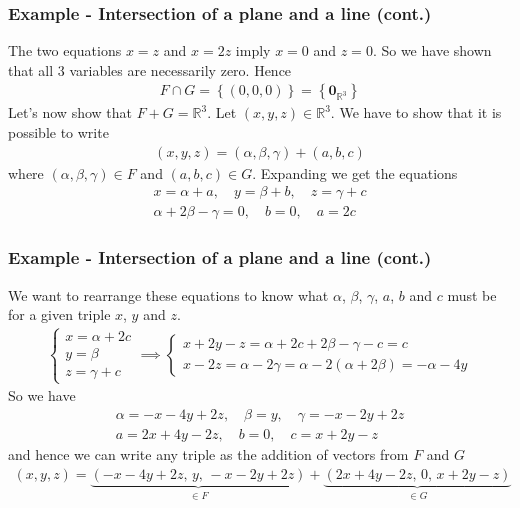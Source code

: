 \documentclass[usenames,dvipsnames,aspectratio=169,10pt]{beamer}
\numberwithin{equation}{section}
\begin{document}
\begin{frame}
\frametitle{Example - Intersection of a plane and a line (cont.)}

The two equations $x=z$ and $x=2z$ imply $x=0$ and $z=0$. So we have shown that all 3 variables are necessarily zero. Hence
\begin{align*}
F \cap G = \left\{ (0,0,0)  \right\} = \left\{ \textbf{0}_{\mathbb{R}^3} \right\}
\end{align*} 
Let's now show that $F+G=\mathbb{R}^3$. Let $(x,y,z)\in \mathbb{R}^3$. We have to show that it is possible to write
\begin{align*}
(x,y,z) = (\alpha,\beta,\gamma) + (a,b,c)
\end{align*}
where $(\alpha,\beta,\gamma)\in F$ and $(a,b,c)\in G$. Expanding we get the equations
\begin{align*}
x = \alpha + a, \quad y = \beta + b, \quad z = \gamma + c \\
\alpha+2\beta-\gamma=0, \quad  b=0, \quad a=2c
\end{align*}
\end{frame}



\begin{frame}
\frametitle{Example - Intersection of a plane and a line (cont.)}
We want to rearrange these equations to know what $\alpha$, $\beta$, $\gamma$, $a$, $b$ and $c$ must be for a given triple $x$, $y$ and $z$.
\begin{align*}
\begin{cases}
x = \alpha + 2c \\
y = \beta \\
z = \gamma + c
\end{cases}
\implies
\begin{cases}
x + 2y - z =  \alpha + 2c + 2\beta - \gamma - c = c\\
x - 2z = \alpha - 2\gamma = \alpha - 2(\alpha+2\beta) = -\alpha-4y
\end{cases}
\end{align*}
So we have \vspace{-0.3cm}
\begin{align*}
\alpha = -x-4y + 2z, \quad \beta=y, \quad \gamma=-x-2y + 2z \\
a = 2x+4y-2z, \quad b=0, \quad c=x+2y-z
\end{align*}
and hence we can write any triple as the addition of vectors from $F$ and $G$
\begin{align*}
(x,y,z) = \underbrace{(-x-4y + 2z, \, y, \, -x-2y + 2z )}_{\in F} + \underbrace{(2x+4y-2z, \, 0, \, x+2y-z)}_{\in G}
\end{align*}
\end{frame}
\end{document}
